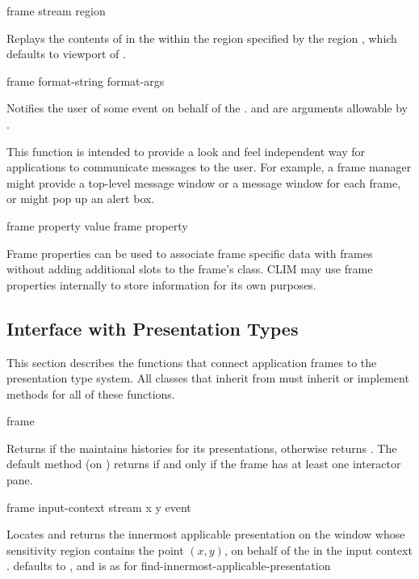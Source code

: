  {frame stream \optional region} 

Replays the contents of  in the   within the
region specified by the region , which defaults to viewport of
.


 {frame format-string \rest format-args}

Notifies the user of some event on behalf of the  .
 and  are arguments allowable by
.

This function is intended to provide a look and feel independent way for
applications to communicate messages to the user.  For example, a frame manager
might provide a top-level message window or a message window for each frame, or
might pop up an alert box.


 {frame property}
 {value frame property} 

Frame properties can be used to associate frame specific data with frames
without adding additional slots to the frame's class.  CLIM may use frame
properties internally to store information for its own purposes.


\subsection {Interface with Presentation Types}

This section describes the functions that connect application frames to the
presentation type system.  All classes that inherit from 
must inherit or implement methods for all of these functions.

 {frame}

Returns  if the   maintains histories for its
presentations, otherwise returns .  The default method (on
) returns  if and only if the frame
has at least one interactor pane.


 {frame input-context stream x y \key event}

Locates and returns the innermost applicable presentation on the window
 whose sensitivity region contains the point $(x,y)$, on behalf of
the   in the input context .
 defaults to , and is as for
{find-innermost-applicable-presentation}

